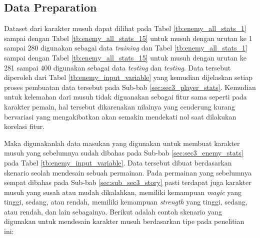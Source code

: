 \subsection{Data Preparation}
\label{sec:sub_sec3_enemy_data_prep}
\vspace{1ex}

Dataset dari karakter musuh dapat dilihat pada Tabel \ref{tb:enemy_all_stats_1} sampai dengan Tabel \ref{tb:enemy_all_stats_15} untuk musuh dengan urutan ke 1 sampai 280 digunakan sebagai data \textit{training} dan Tabel \ref{tb:enemy_all_stats_1} sampai dengan Tabel \ref{tb:enemy_all_stats_15} untuk musuh dengan urutan ke 281 sampai 400 digunakan sebagai data \textit{testing} dan \textit{testing}. Data tersebut diperoleh dari Tabel \ref{tb:enemy_input_variable} yang kemudian dijelaskan setiap proses pembuatan data tersebut pada Sub-bab \ref{sec:sec3_player_stats}. Kemudian untuk kelemahan dari musuh tidak diguanakan sebagai fitur sama seperti pada karakter pemain, hal tersebut dikarenakan nilainya yang cenderung kurang bervariasi yang mengakibatkan akan semakin mendekati nol saat dilakukan korelasi fitur.
\vspace{1ex}

Maka digunakanlah data masukan yang digunakan untuk membuat karakter musuh yang sebelumnya sudah dibahas pada Sub-bab \ref{sec:sec3_enemy_stats} pada Tabel \ref{tb:enemy_input_variable}. Data tersebut dibuat berdasarkan skenario seolah mendesain sebuah permainan. Pada permainan yang sebelumnya sempat dibahas pada Sub-bab \ref{sec:sub_sec3_story} pasti terdapat juga karakter musuh yang susah atau mudah dikalahkan, memiliki kemampuan \textit{magic} yang tinggi, sedang, atau rendah, memiliki kemampuan \textit{strength} yang tinggi, sedang, atau rendah, dan lain sebagainya. Berikut adalah contoh skenario yang digunakan untuk mendesain karakter musuh berdasarkan tipe pada penelitian ini:

